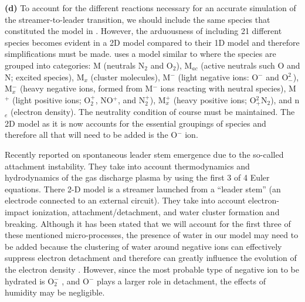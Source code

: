 \documentclass[]{article}
\begin{document}
	 \textbf{(d)} To account for the different reactions necessary for an accurate simulation of the streamer-to-leader transition, we should include the same species that constituted the model in \citet{daSilva:2013a}. However, the arduousness of including 21 different species becomes evident in a 2D model compared to their 1D model and therefore simplifications must be made. \citet{Liu:2012a} uses a model similar to \citet{Lehtinen:2007} where the species are grouped into categories: M (neutrals N$_2$ and O$_2$), M$_{ac}$ (active neutrals such O and N; excited species), M$_x$ (cluster molecules), M$^-$ (light negative ions: O$^-$ and O$^{2}_{-}$), M$_x^-$ (heavy negative ions, formed from M$^-$ ions reacting with neutral species), M$^+$ (light positive ions; O$^+_2$, NO$^+$, and N$_{2}^{+}$), M$_x^+$ (heavy positive ions; O$^2_+$N$_2$), and n$_e$ (electron density). The neutrality condition of course must be maintained. The 2D model as it is now accounts for the essential groupings of species and therefore all that will need to be added is the O$^-$ ion.
	 
	 Recently \citet{Malagon:2019} reported on spontaneous leader stem emergence due to the so-called attachment instability. They take into account thermodynamics and hydrodynamics of the gas discharge plasma by using the first 3 of 4 Euler equations. There 2-D model is a streamer launched from a ``leader stem'' (an electrode connected to an external circuit). They take into account electron-impact ionization, attachment/detachment, and water cluster formation and breaking. Although it has been stated that we will account for the first three of these mentioned micro-processes, the presence of water in our model may need to be added because the clustering of water around negative ions can effectively suppress electron detachment and therefore can greatly influence the evolution of the electron density \citep{Malagon:2019,Luque:2017b,Gallimberti:1979}. However, since the most probable type of negative ion to be hydrated is O$_2^-$ \citep{Luque:2017b,Gallimberti:1979}, and O$^-$ plays a larger role in detachment, the effects of humidity may be negligible.
 
\end{document}
